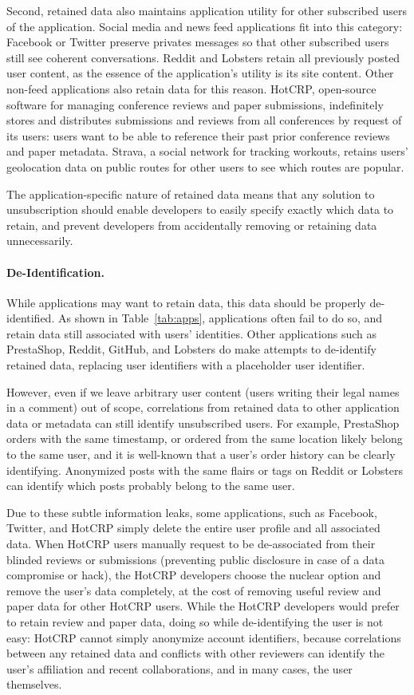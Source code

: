 Second, retained data also maintains application utility for other subscribed users of the
application. Social media and news feed applications fit into this category: Facebook or Twitter
preserve privates messages so that other subscribed users still see coherent conversations. Reddit
and Lobsters retain all previously posted user content, as the essence of the application's utility
is its site content.  Other non-feed applications also retain data for this reason. HotCRP,
open-source software for managing conference reviews and paper submissions, indefinitely stores and
distributes submissions and reviews from all conferences by request of its users: users want to be
able to reference their past prior conference reviews and paper metadata. Strava, a social network
for tracking workouts, retains users' geolocation data on public routes for other users to see which
routes are popular.

The application-specific nature of retained data means that any solution to unsubscription
should enable developers to easily specify exactly which data to retain, and prevent developers
from accidentally removing or retaining data unnecessarily.

\paragraph{De-Identification.}
While applications may want to retain data, this data should be properly de-identified. As shown in
Table~\ref{tab:apps}, applications often fail to do so, and retain data still associated
with users' identities. Other applications such as PrestaShop, Reddit, GitHub, and Lobsters do make
attempts to de-identify retained data, replacing user identifiers with a placeholder user identifier. 

However, even if we leave arbitrary user content (\eg users writing their legal names in a comment)
out of scope, correlations from retained data to other application data or metadata can still
identify unsubscribed users. For example, PrestaShop orders with the same timestamp, or ordered from
the same location likely belong to the same user, and it is well-known that a user's order history
can be clearly identifying. Anonymized posts with the same flairs or tags on Reddit or Lobsters can
identify which posts probably belong to the same user. 

Due to these subtle information leaks, some applications, such as Facebook, Twitter, and HotCRP
simply delete the entire user profile and all associated data. When HotCRP users manually request to
be de-associated from their blinded reviews or submissions (preventing public disclosure in case of
a data compromise or hack), the HotCRP developers choose the nuclear option and remove the user's
data completely, at the cost of removing useful review and paper data for other HotCRP users.  While
the HotCRP developers would prefer to retain review and paper data, doing so while de-identifying
the user is not easy: HotCRP cannot simply anonymize account identifiers, because
correlations between any retained data and conflicts with other reviewers can identify the user's
affiliation and recent collaborations, and in many cases, the user themselves.

